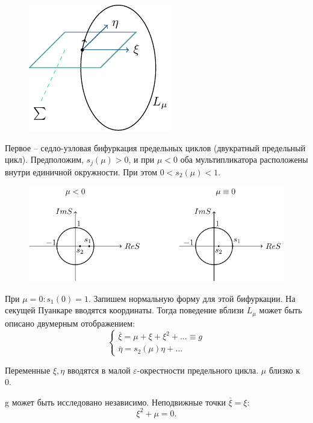 \begin{figure} 
	\vspace{0.1em}
	\centering
	\includegraphics[scale=1]{fig/fig62.pdf}
	\vspace{-0.25em}
\end{figure}

Первое -- седло-узловая бифуркация предельных циклов (двукратный предельный цикл). Предположим, $s_j(\mu)>0$, и при $\mu<0$ оба мультипликатора расположены внутри единичной окружности. При этом $0<s_2(\mu)<1$.
\begin{figure}[H]
	\centering
	\includegraphics[width=1\linewidth]{fig/fig63.pdf}   
\end{figure}

При $\mu=0: s_1(0)= 1$. Запишем нормальную форму для этой бифуркации. На секущей Пуанкаре вводятся координаты. Тогда поведение вблизи $L_{\mu}$ может быть описано двумерным отображением:
\begin{equation}
	\left\{\begin{aligned}
		\stackrel{\_}{\xi}= \mu+\xi+\xi^2+\dots \equiv g\\
		\stackrel{\_}{\eta}= s_2(\mu)\eta+\dots
	\end{aligned}\right.
	\label{eq:109}	
\end{equation}

Переменные $\xi, \eta$ вводятся в малой $\varepsilon$-окрестности предельного цикла. $\mu$ близко к 0.

g может быть исследовано независимо. Неподвижные точки $\stackrel{\_}{\xi}=\xi$:
$$\xi^2+\mu=0.$$

